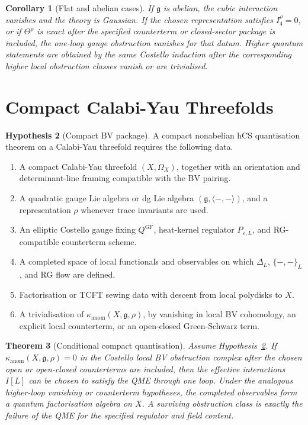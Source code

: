 \documentclass[11pt]{article}
\providecommand{\fg}{\mathfrak{g}}
\providecommand{\kanom}{\kappa_{\mathrm{anom}}}
\theoremstyle{plain}
\newtheorem{theorem}{Theorem}[section]
\newtheorem{corollary}[theorem]{Corollary}
\theoremstyle{definition}
\newtheorem{hypothesis}[theorem]{Hypothesis}
\theoremstyle{remark}
\begin{document}
\begin{corollary}[Flat and abelian cases]
\label{cor:flat-abelian}
If \(\fg\) is abelian, the cubic interaction vanishes and the theory is
Gaussian. If the chosen representation satisfies \(I_4^\rho=0\), or if
\(\Theta^\rho\) is exact after the specified counterterm or closed-sector
package is included, the one-loop gauge obstruction vanishes for that
datum. Higher quantum statements are obtained by the same Costello
induction after the corresponding higher local obstruction classes
vanish or are trivialised.
\end{corollary}

\section{Compact Calabi-Yau Threefolds}
\label{sec:compact-package}

\begin{hypothesis}[Compact BV package]
\label{hyp:compact-bv}
A compact nonabelian hCS quantisation theorem on a Calabi-Yau
threefold requires the following data.
\begin{enumerate}
\item A compact Calabi-Yau threefold \((X,\Omega_X)\), together with an
orientation and determinant-line framing compatible with the BV
pairing.
\item A quadratic gauge Lie algebra or dg Lie algebra
\((\fg,\langle-,-\rangle)\), and a representation \(\rho\) whenever
trace invariants are used.
\item An elliptic Costello gauge fixing \(Q^{\mathrm{GF}}\), heat-kernel
regulator \(P_{\varepsilon,L}\), and RG-compatible counterterm scheme.
\item A completed space of local functionals and observables on which
\(\Delta_L\), \(\{-,-\}_L\), and RG flow are defined.
\item Factorisation or TCFT sewing data with descent from local
polydisks to \(X\).
\item A trivialisation of \(\kanom(X,\fg,\rho)\), by vanishing in local
BV cohomology, an explicit local counterterm, or an open-closed
Green-Schwarz term.
\end{enumerate}
\end{hypothesis}

\begin{theorem}[Conditional compact quantisation]
\label{thm:conditional-compact}
Assume Hypothesis~\ref{hyp:compact-bv}. If
\(\kanom(X,\fg,\rho)=0\) in the Costello local BV obstruction complex
after the chosen open or open-closed counterterms are included, then
the effective interactions \(I[L]\) can be chosen to satisfy the QME
through one loop. Under the analogous higher-loop vanishing or
counterterm hypotheses, the completed observables form a quantum
factorisation algebra on \(X\). A surviving obstruction class is
exactly the failure of the QME for the specified regulator and field
content.
\end{theorem}
\end{document}
